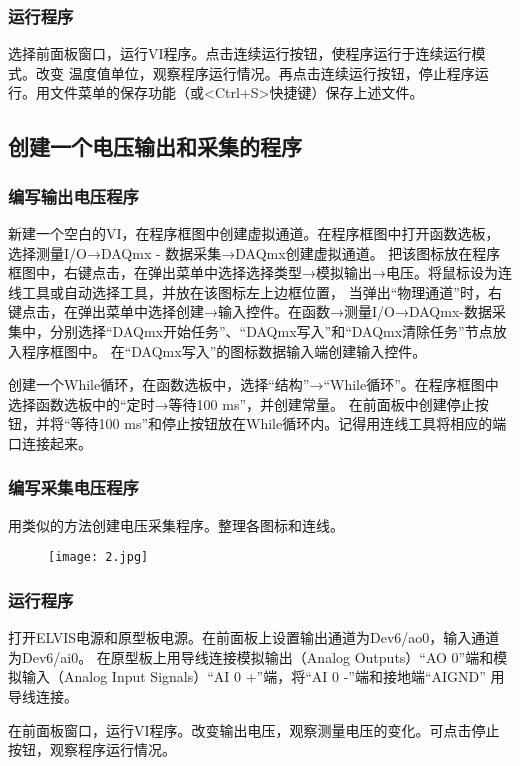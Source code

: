 \documentclass[12pt,a4paper]{article}
\begin{document}
    \subsubsection{运行程序}
    选择前面板窗口，运行VI程序。点击连续运行按钮，使程序运行于连续运行模式。改变
    温度值单位，观察程序运行情况。再点击连续运行按钮，停止程序运行。用文件菜单的保存功能（或<Ctrl+S>快捷键）保存上述文件。

    \subsection{创建一个电压输出和采集的程序}
    \subsubsection{编写输出电压程序}
    新建一个空白的VI，在程序框图中创建虚拟通道。在程序框图中打开函数选板，选择测量I/O→DAQmx - 数据采集→DAQmx创建虚拟通道。
    把该图标放在程序框图中，右键点击，在弹出菜单中选择选择类型→模拟输出→电压。将鼠标设为连线工具或自动选择工具，并放在该图标左上边框位置，
    当弹出“物理通道”时，右键点击，在弹出菜单中选择创建→输入控件。在函数→测量I/O→DAQmx-数据采集中，分别选择“DAQmx开始任务”、“DAQmx写入”和“DAQmx清除任务”节点放入程序框图中。
    在“DAQmx写入”的图标数据输入端创建输入控件。

    创建一个While循环，在函数选板中，选择“结构”→“While循环”。在程序框图中选择函数选板中的“定时→等待100 ms”，并创建常量。
    在前面板中创建停止按钮，并将“等待100 ms”和停止按钮放在While循环内。记得用连线工具将相应的端口连接起来。

    \subsubsection{编写采集电压程序}
    用类似的方法创建电压采集程序。整理各图标和连线。
    \begin{figure}[H]
        \centering
        \texttt{[image: 2.jpg]}
    \end{figure}
    \subsubsection{运行程序}
    打开ELVIS电源和原型板电源。在前面板上设置输出通道为Dev6/ao0，输入通道为Dev6/ai0。
    在原型板上用导线连接模拟输出（Analog Outputs）“AO 0”端和模拟输入（Analog Input Signals）“AI 0 +”端，将“AI 0 -”端和接地端“AIGND” 用导线连接。

    在前面板窗口，运行VI程序。改变输出电压，观察测量电压的变化。可点击停止按钮，观察程序运行情况。
\end{document}
